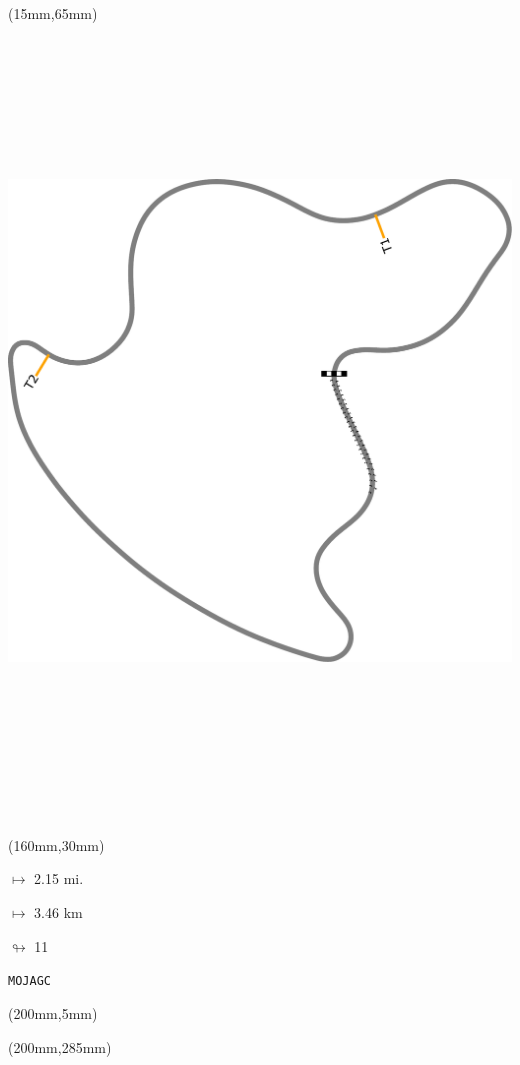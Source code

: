 \begin{textblock*}{185mm}(15mm,65mm)%
\centering
\mbox{\includegraphics[width=185mm,height=210mm,keepaspectratio]{PT/MOJAGC.pdf}}
\end{textblock*}
\begin{textblock*}{40mm}(160mm,30mm)%
\Large
\par$\mapsto$ 2.15 mi.
\par$\mapsto$ 3.46 km
\par$\looparrowright$ 11
\par\hfill\tiny\tt MOJAGC\\
\end{textblock*}
\begin{textblock*}{20mm}(200mm,5mm)%
\fbox{\thepage}
\label{MOJAGC}
\end{textblock*}
\begin{textblock*}{20mm}(200mm,285mm)%
\fbox{\thepage}
\end{textblock*}

